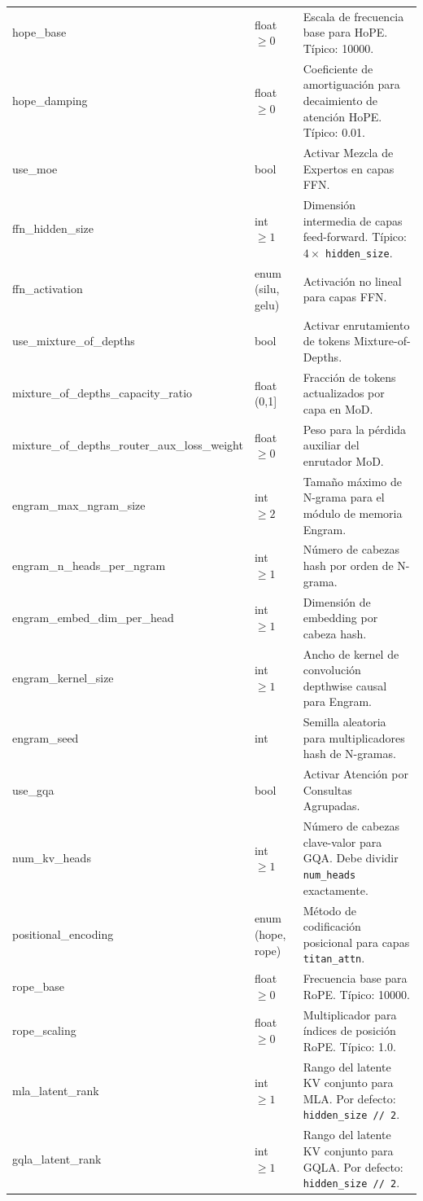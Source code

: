 \begin{longtable}{>{\ttfamily}l>{\raggedright\arraybackslash}p{3.5cm}>{\raggedright\arraybackslash}p{8.5cm}}
hope\_base & float $\ge 0$ & Escala de frecuencia base para HoPE. Típico: 10000. \\
hope\_damping & float $\ge 0$ & Coeficiente de amortiguación para decaimiento de atención HoPE. Típico: 0.01. \\
use\_moe & bool & Activar Mezcla de Expertos en capas FFN. \\
ffn\_hidden\_size & int $\ge 1$ & Dimensión intermedia de capas feed-forward. Típico: $4\times$ \texttt{hidden\_size}. \\
ffn\_activation & enum (silu, gelu) & Activación no lineal para capas FFN. \\
use\_mixture\_of\_depths & bool & Activar enrutamiento de tokens Mixture-of-Depths. \\
mixture\_of\_depths\_capacity\_ratio & float (0,1] & Fracción de tokens actualizados por capa en MoD. \\
mixture\_of\_depths\_router\_aux\_loss\_weight & float $\ge 0$ & Peso para la pérdida auxiliar del enrutador MoD. \\
engram\_max\_ngram\_size & int $\ge 2$ & Tamaño máximo de N-grama para el módulo de memoria Engram. \\
engram\_n\_heads\_per\_ngram & int $\ge 1$ & Número de cabezas hash por orden de N-grama. \\
engram\_embed\_dim\_per\_head & int $\ge 1$ & Dimensión de embedding por cabeza hash. \\
engram\_kernel\_size & int $\ge 1$ & Ancho de kernel de convolución depthwise causal para Engram. \\
engram\_seed & int & Semilla aleatoria para multiplicadores hash de N-gramas. \\
use\_gqa & bool & Activar Atención por Consultas Agrupadas. \\
num\_kv\_heads & int $\ge 1$ & Número de cabezas clave-valor para GQA. Debe dividir \texttt{num\_heads} exactamente. \\
positional\_encoding & enum (hope, rope) & Método de codificación posicional para capas \texttt{titan\_attn}. \\
rope\_base & float $\ge 0$ & Frecuencia base para RoPE. Típico: 10000. \\
rope\_scaling & float $\ge 0$ & Multiplicador para índices de posición RoPE. Típico: 1.0. \\
mla\_latent\_rank & int $\ge 1$ & Rango del latente KV conjunto para MLA. Por defecto: \texttt{hidden\_size // 2}. \\
gqla\_latent\_rank & int $\ge 1$ & Rango del latente KV conjunto para GQLA. Por defecto: \texttt{hidden\_size // 2}. \\

\end{longtable}
